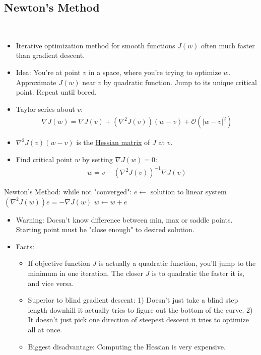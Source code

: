 \documentclass[10pt]{article}
\begin{document}
	\subsection*{Newton's Method}
	\
		\begin{itemize}
			\item Iterative optimization method for smooth functions $J(w)$ often much faster than gradient descent.
			\item Idea: You're at point $v$ in a space, where you're trying to optimize $w$. Approximate $J(w)$ near $v$ by quadratic function. Jump to its unique critical point. Repeat until bored.
			\item Taylor series about $v$:
				\begin{align*}
					\nabla J(w) = \nabla J(v) + (\nabla^{2}J(v))(w-v) + \mathcal{O}(|w - v|^{2})
				\end{align*}
			\item $\nabla^{2}J(v)(w-v)$ is the \underline{Hessian matrix} of $J$ at $v$.
			\item Find critical point $w$ by setting $\nabla J(w) = 0$:
				\begin{align*}
					w = v - (\nabla^{2}J(v))^{-1}\nabla J(v)
				\end{align*}
			\end{itemize}
\begin{codeblock}
	Newton's Method:
	    while not "converged":
	        $e \leftarrow$ solution to linear system $(\nabla^{2}J(w))e = -\nabla J(w)$
	        $w \leftarrow w + e$
\end{codeblock}
			\begin{itemize}
			\item Warning: Doesn't know difference between min, max or saddle points. Starting point must be "close enough" to desired solution.
			\item Facts:
				\begin{itemize}
					\item If objective function $J$ is actually a quadratic function, you'll jump to the minimum in one iteration. The closer $J$ is to quadratic the faster it is, and vice versa.
					\item Superior to blind gradient descent: 1) Doesn't just take a blind step length downhill it actually tries to figure out the bottom of the curve. 2) It doesn't just pick one direction of steepest descent it tries to optimize all at once.
					\item Biggest disadvantage: Computing the Hessian is very expensive. 
				\end{itemize}
		\end{itemize}
		
\end{document}
